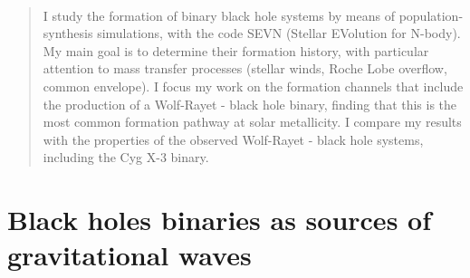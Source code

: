 \documentclass[a4paper,titlepage]{book}     	%
\newenvironment{abstract}{\newpage \thispagestyle{empty} \vspace*{3\baselineskip}
	\begin{center}\Large\textbf\abstractname\end{center}
	\begin{quotation}
	}{\end{quotation}\clearpage}
\begin{document}
\frontmatter

\begin{frontespizio}
	\Preambolo{\renewcommand{\frontinstitutionfont}{\fontsize{15}{12}\bfseries}}
	\Preambolo{\renewcommand{\frontdivisionfont}{\fontsize{16}{30}\selectfont}}
	\Preambolo{\renewcommand{\frontpretitlefont}{\fontsize{16}{20}\scshape}}
	\Preambolo{\renewcommand{\fronttitlefont}{\fontsize{19}{35}\bfseries}}
	\Preambolo{\renewcommand{\frontnamesfont}{\fontsize{15}{20}\bfseries}}
	\Preambolo{\renewcommand{\frontfixednamesfont}{\fontsize{13}{20}\selectfont}}

	\Rientro{2cm}
\end{frontespizio}	

\
\begin{abstract}
I study the formation of binary black hole systems by means of population-synthesis simulations, with the code SEVN (Stellar EVolution for N-body). My main goal is to determine their formation history, with particular attention to mass transfer processes (stellar winds, Roche Lobe overflow, common envelope). I focus my work on the formation channels that include the production of a Wolf-Rayet - black hole binary, finding that this is the most common formation pathway at solar metallicity. I compare my results with the properties of the observed Wolf-Rayet - black hole systems, including the Cyg X-3 binary.

\end{abstract}

\tableofcontents
{}

\mainmatter

\chapter{Black holes binaries as sources of gravitational waves}
\end{document}
